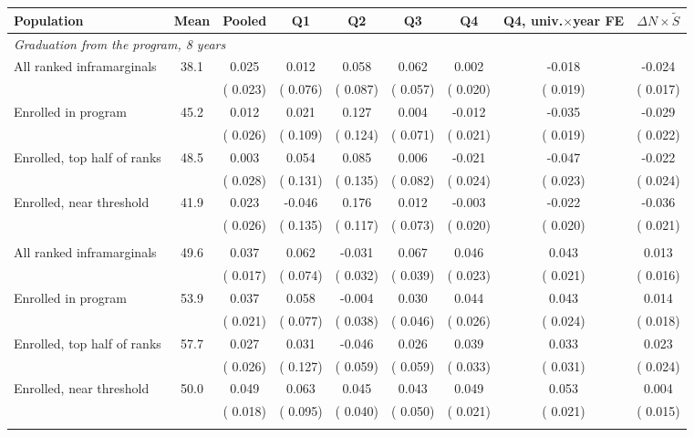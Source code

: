 \begin{tabular}{lcccccccc}
\toprule
Population & Mean & Pooled & Q1 & Q2 & Q3 & Q4 & Q4, univ.\(\times\)year FE & \(\Delta N\times\tilde S\) \\
\midrule
\multicolumn{9}{l}{\textit{Graduation from the program, 8 years}} \\
All ranked inframarginals &  38.1 &   0.025 &   0.012 &   0.058 &   0.062 &   0.002 &  -0.018 &  -0.024 \\
 &  & ( 0.023) & ( 0.076) & ( 0.087) & ( 0.057) & ( 0.020) & ( 0.019) & ( 0.017) \\
Enrolled in program &  45.2 &   0.012 &   0.021 &   0.127 &   0.004 &  -0.012 &  -0.035\sym{*} &  -0.029 \\
 &  & ( 0.026) & ( 0.109) & ( 0.124) & ( 0.071) & ( 0.021) & ( 0.019) & ( 0.022) \\
\quad Enrolled, top half of ranks &  48.5 &   0.003 &   0.054 &   0.085 &   0.006 &  -0.021 &  -0.047\sym{**} &  -0.022 \\
 &  & ( 0.028) & ( 0.131) & ( 0.135) & ( 0.082) & ( 0.024) & ( 0.023) & ( 0.024) \\
\quad Enrolled, near threshold &  41.9 &   0.023 &  -0.046 &   0.176 &   0.012 &  -0.003 &  -0.022 &  -0.036\sym{*} \\
 &  & ( 0.026) & ( 0.135) & ( 0.117) & ( 0.073) & ( 0.020) & ( 0.020) & ( 0.021) \\
\addlinespace
\multicolumn{9}{l}{\textit{Graduation from any university, 8 years}} \\
All ranked inframarginals &  49.6 &   0.037\sym{**} &   0.062 &  -0.031 &   0.067\sym{*} &   0.046\sym{**} &   0.043\sym{**} &   0.013 \\
 &  & ( 0.017) & ( 0.074) & ( 0.032) & ( 0.039) & ( 0.023) & ( 0.021) & ( 0.016) \\
Enrolled in program &  53.9 &   0.037\sym{*} &   0.058 &  -0.004 &   0.030 &   0.044\sym{*} &   0.043\sym{*} &   0.014 \\
 &  & ( 0.021) & ( 0.077) & ( 0.038) & ( 0.046) & ( 0.026) & ( 0.024) & ( 0.018) \\
\quad Enrolled, top half of ranks &  57.7 &   0.027 &   0.031 &  -0.046 &   0.026 &   0.039 &   0.033 &   0.023 \\
 &  & ( 0.026) & ( 0.127) & ( 0.059) & ( 0.059) & ( 0.033) & ( 0.031) & ( 0.024) \\
\quad Enrolled, near threshold &  50.0 &   0.049\sym{***} &   0.063 &   0.045 &   0.043 &   0.049\sym{**} &   0.053\sym{***} &   0.004 \\
 &  & ( 0.018) & ( 0.095) & ( 0.040) & ( 0.050) & ( 0.021) & ( 0.021) & ( 0.015) \\
\addlinespace
\bottomrule
\end{tabular}

